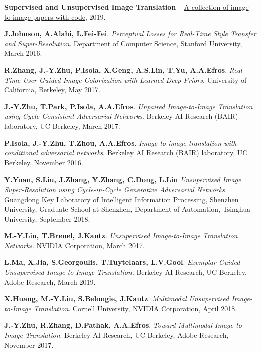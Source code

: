 \documentclass[11pt,a4paper]{extarticle}
\begin{document}
{\newpage
\begin{thebibliography}{00}

	
	\textbf{Supervised and Unsupervised Image Translation} --
	\href{https://github.com/lzhbrian/image-to-image-papers}{A collection of image to image papers with code},
	2019.

	\textbf{J.Johnson, A.Alahi, L.Fei-Fei}.
	\emph{Perceptual Losses for Real-Time Style Transfer and Super-Resolution}.
	Department of Computer Science, Stanford University,
	March 2016.

	\textbf{R.Zhang, J.-Y.Zhu, P.Isola, X.Geng, A.S.Lin, T.Yu, A.A.Efros}.
	\emph{Real-Time User-Guided Image Colorization with Learned Deep Priors}.
	University of California, Berkeley,
	May 2017.

	\textbf{J.-Y.Zhu, T.Park, P.Isola, A.A.Efros}.
	\emph{Unpaired Image-to-Image Translation using Cycle-Consistent Adversarial Networks}.
	Berkeley AI Research (BAIR) laboratory, UC Berkeley,
	March 2017.

	\textbf{P.Isola, J.-Y.Zhu, T.Zhou, A.A.Efros}.
	\emph{Image-to-image translation with conditional adversarial networks}.
	Berkeley AI Research (BAIR) laboratory, UC Berkeley,
	November 2016.

	\textbf{Y.Yuan, S.Liu, J.Zhang, Y.Zhang, C.Dong, L.Lin}
	\emph{Unsupervised Image Super-Resolution using Cycle-in-Cycle Generative Adversarial Networks}
	Guangdong Key Laboratory of Intelligent Information Processing, Shenzhen University,
	Graduate School at Shenzhen, Department of Automation, Tsinghua University,
	September 2018.

	\textbf{M.-Y.Liu, T.Breuel, J.Kautz}.
	\emph{Unsupervised Image-to-Image Translation Networks}.
	NVIDIA Corporation,
	March 2017.
	
	\textbf{L.Ma, X.Jia, S.Georgoulis, T.Tuytelaars, L.V.Gool}.
	\emph{Exemplar Guided Unsupervised Image-to-Image Translation}.
	Berkeley AI Research, UC Berkeley, Adobe Research,
	March 2019.

	\textbf{X.Huang, M.-Y.Liu, S.Belongie, J.Kautz}.
	\emph{Multimodal Unsupervised Image-to-Image Translation}.
	Cornell University, NVIDIA Corporation,
	April 2018.
	
	\textbf{J.-Y.Zhu, R.Zhang, D.Pathak, A.A.Efros}.
	\emph{Toward Multimodal Image-to-Image Translation}.
	Berkeley AI Research, UC Berkeley, Adobe Research,
	November 2017.
	

\end{thebibliography}}
\end{document}

